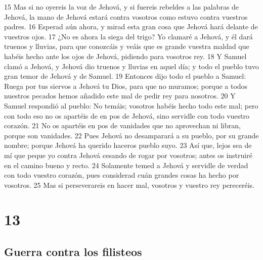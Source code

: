 15 Mas si no oyereis la voz de Jehová, y si fuereis rebeldes a las palabras de Jehová, la mano de Jehová estará contra vosotros como estuvo contra vuestros padres.
16 Esperad aún ahora, y mirad esta gran cosa que Jehová hará delante de vuestros ojos.
17 ¿No es ahora la siega del trigo? Yo clamaré a Jehová, y él dará truenos y lluvias, para que conozcáis y veáis que es grande vuestra maldad que habéis hecho ante los ojos de Jehová, pidiendo para vosotros rey.
18 Y Samuel clamó a Jehová, y Jehová dio truenos y lluvias en aquel día; y todo el pueblo tuvo gran temor de Jehová y de Samuel.
19 Entonces dijo todo el pueblo a Samuel: Ruega por tus siervos a Jehová tu Dios, para que no muramos; porque a todos nuestros pecados hemos añadido este mal de pedir rey para nosotros.
20 Y Samuel respondió al pueblo: No temáis; vosotros habéis hecho todo este mal; pero con todo eso no os apartéis de en pos de Jehová, sino servidle con todo vuestro corazón.
21 No os apartéis en pos de vanidades que no aprovechan ni libran, porque son vanidades.
22 Pues Jehová no desamparará a su pueblo, por su grande nombre; porque Jehová ha querido haceros pueblo suyo.
23 Así que, lejos sea de mí que peque yo contra Jehová cesando de rogar por vosotros; antes os instruiré en el camino bueno y recto.
24 Solamente temed a Jehová y servidle de verdad con todo vuestro corazón, pues considerad cuán grandes cosas ha hecho por vosotros.
25 Mas si perseverareis en hacer mal, vosotros y vuestro rey pereceréis.

\chapter{13}

\section*{Guerra contra los filisteos}


